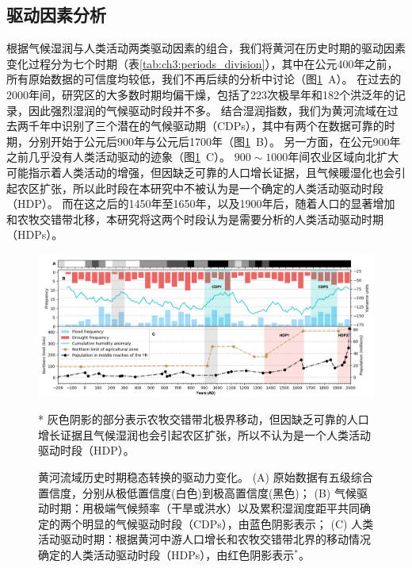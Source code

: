 
\subsection{驱动因素分析}
根据气候湿润与人类活动两类驱动因素的组合，我们将黄河在历史时期的驱动因素变化过程分为七个时期（表\ref{tab:ch3:periods_division}），其中在公元400年之前，所有原始数据的可信度均较低，我们不再后续的分析中讨论（图\ref{fig:ch3:drivers}~A）。
在过去的2000年间，研究区的大多数时期均偏干燥，包括了223次极旱年和182个洪泛年的记录，因此强烈湿润的气候驱动时段并不多。
结合湿润指数，我们为黄河流域在过去两千年中识别了三个潜在的气候驱动期（CDPs），其中有两个在数据可靠的时期，分别开始于公元后900年与公元后1700年（图\ref{fig:ch3:drivers}~B）。
另一方面，在公元900年之前几乎没有人类活动驱动的迹象（图\ref{fig:ch3:drivers}~C）。
$900\sim1000$年间农业区域向北扩大可能指示着人类活动的增强，但因缺乏可靠的人口增长证据，且气候暖湿化也会引起农区扩张，所以此时段在本研究中不被认为是一个确定的人类活动驱动时段（HDP）。
而在这之后的1450年至1650年，以及1900年后，随着人口的显著增加和农牧交错带北移，本研究将这两个时段认为是需要分析的人类活动驱动时期（HDPs）。



\begin{figure}[htb]
    \includegraphics[width=\textwidth]{img/ch3/ch3_drivers.png}
    \caption[黄河流域历史时期稳态转换的驱动力变化]{黄河流域历史时期稳态转换的驱动力变化。
    (A) 原始数据有五级综合置信度，分别从极低置信度(白色)到极高置信度(黑色)；
    (B) 气候驱动时期：用极端气候频率（干旱或洪水）以及累积湿润度距平共同确定的两个明显的气候驱动时段（CDPs），由蓝色阴影表示；
    (C) 人类活动驱动时期：根据黄河中游人口增长和农牧交错带北界的移动情况确定的人类活动驱动时段（HDPs），由红色阴影表示$^*$。}
    \footnotesize
    * 灰色阴影的部分表示农牧交错带北极界移动，但因缺乏可靠的人口增长证据且气候湿润也会引起农区扩张，所以不认为是一个人类活动驱动时段（HDP）。
    \label{fig:ch3:drivers}
\end{figure}

